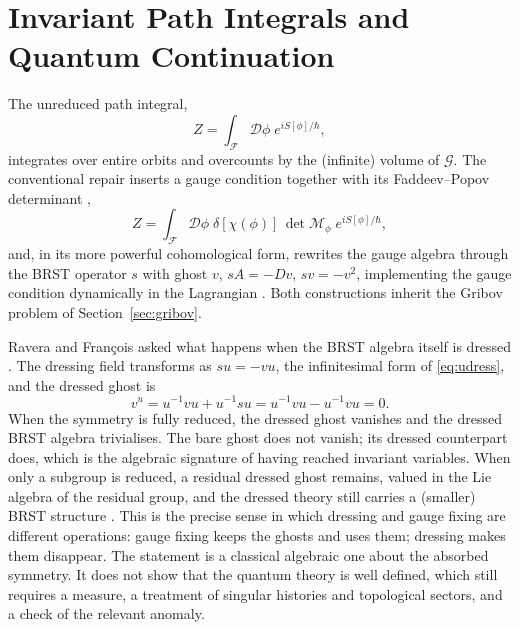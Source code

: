 \documentclass[11pt]{article}
\theoremstyle{plain}
\theoremstyle{definition}
\theoremstyle{remark}
\newcommand{\F}{\mathcal F}
\newcommand{\G}{\mathcal G}
\begin{document}
\section{Invariant Path Integrals and Quantum Continuation}\label{sec:pathint}

The unreduced path integral,
\begin{equation}
Z=\int_\F\mathcal D\phi\;e^{iS[\phi]/\hbar},
\end{equation}
integrates over entire orbits and overcounts by the (infinite) volume of $\G$. The conventional repair inserts a gauge condition together with its Faddeev--Popov determinant \cite{faddeev-popov},
\begin{equation}
Z=\int_\F\mathcal D\phi\;\delta[\chi(\phi)]\,\det\mathcal M_\phi\;e^{iS[\phi]/\hbar},
\end{equation}
and, in its more powerful cohomological form, rewrites the gauge algebra through the BRST operator $s$ with ghost $v$, $sA=-Dv$, $sv=-v^2$, implementing the gauge condition dynamically in the Lagrangian \cite{brs,henneaux-teitelboim}. Both constructions inherit the Gribov problem of Section~\ref{sec:gribov}.

Ravera and François asked what happens when the BRST algebra itself is dressed \cite{fr-susy-rel,ravera-notes}. The dressing field transforms as $su=-vu$, the infinitesimal form of \eqref{eq:udress}, and the dressed ghost is
\begin{equation}
v^u=u^{-1}vu+u^{-1}su=u^{-1}vu-u^{-1}vu=0 .
\end{equation}
When the symmetry is fully reduced, the dressed ghost vanishes and the dressed BRST algebra trivialises. The bare ghost does not vanish; its dressed counterpart does, which is the algebraic signature of having reached invariant variables. When only a subgroup is reduced, a residual dressed ghost remains, valued in the Lie algebra of the residual group, and the dressed theory still carries a (smaller) BRST structure \cite{toe,fr-susy-rel}. This is the precise sense in which dressing and gauge fixing are different operations: gauge fixing keeps the ghosts and uses them; dressing makes them disappear. The statement is a classical algebraic one about the absorbed symmetry. It does not show that the quantum theory is well defined, which still requires a measure, a treatment of singular histories and topological sectors, and a check of the relevant anomaly.
\end{document}
